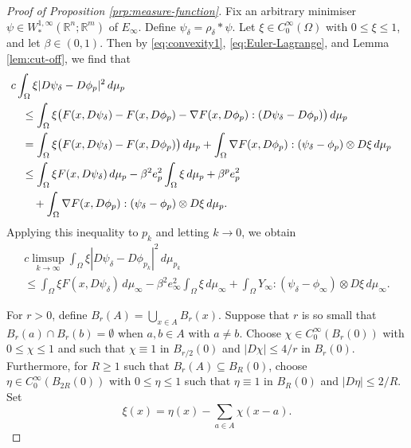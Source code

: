 \documentclass[a4paper]{article}
\newcommand{\R}{\mathbb{R}}
\newcommand{\grad}{\nabla}
\theoremstyle{definition}
\theoremstyle{remark}
\begin{document}
\begin{proof}[Proof of Proposition \ref{prp:measure-function}]
Fix an arbitrary minimiser $\psi \in W_*^{1, \infty}(\R^n; \R^m)$
of $E_\infty$. Define $\psi_\delta = \rho_\delta * \psi$.
Let $\xi \in C_0^\infty(\Omega)$ with $0 \le \xi \le 1$, and let
$\beta \in (0, 1)$. Then by \eqref{eq:convexity1},
\eqref{eq:Euler-Lagrange}, and Lemma \ref{lem:cut-off}, we find that
\[
\begin{split}
\lefteqn{c\int_\Omega \xi |D\psi_\delta - D\phi_p|^2 \, d\mu_p} \quad \\
& \le \int_\Omega \xi \bigl(F(x, D\psi_\delta) - F(x, D\phi_p) - \grad F(x, D\phi_p) : (D\psi_\delta - D\phi_p)\bigr) \, d\mu_p \\
& = \int_\Omega \xi \bigl(F(x, D\psi_\delta) - F(x, D\phi_p)\bigr) \, d\mu_p + \int_\Omega \grad F(x, D\phi_p) : (\psi_\delta - \phi_p) \otimes D\xi \, d\mu_p \\
& \le \int_\Omega \xi F(x, D\psi_\delta) \, d\mu_p - \beta^2 e_p^2 \int_\Omega \xi \, d\mu_p + \beta^p e_p^2 \\
& \quad + \int_\Omega \grad F(x, D\phi_p) : (\psi_\delta - \phi_p) \otimes D\xi \, d\mu_p.
\end{split}
\]
Applying this inequality to $p_k$ and letting $k \to 0$, we obtain
\begin{multline*}
c \limsup_{k \to \infty} \int_\Omega \xi |D\psi_\delta - D\phi_{p_k}|^2 \, d\mu_{p_k} \\
\le \int_\Omega \xi F(x, D\psi_\delta) \, d\mu_\infty - \beta^2 e_\infty^2 \int_\Omega \xi \, d\mu_\infty + \int_\Omega Y_\infty : (\psi_\delta - \phi_\infty) \otimes D\xi \, d\mu_\infty.
\end{multline*}

For $r > 0$, define $B_r(A) = \bigcup_{x \in A} B_r(x)$. Suppose that $r$ is so small that
$B_r(a) \cap B_r(b) = \emptyset$ when $a, b \in A$ with $a \neq b$. Choose $\chi \in C_0^\infty(B_r(0))$
with $0 \le \chi \le 1$ and such that $\chi \equiv 1$ in $B_{r/2}(0)$ and $|D\chi| \le 4/r$
in $B_r(0)$. Furthermore, for $R \ge 1$ such that $B_r(A) \subseteq B_R(0)$, choose $\eta \in C_0^\infty(B_{2R}(0))$
with $0 \le \eta \le 1$ such that $\eta \equiv 1$ in $B_R(0)$ and $|D\eta| \le 2/R$. Set
\[
\xi(x) = \eta(x) - \sum_{a \in A} \chi(x - a).
\]


\end{proof}
\end{document}
